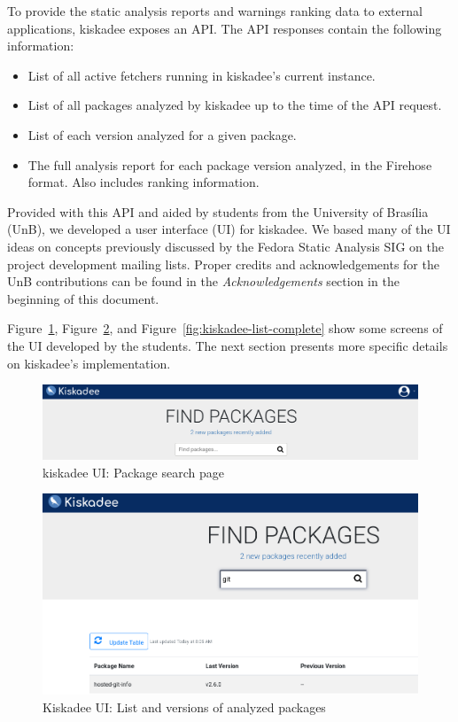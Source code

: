 To provide the static analysis reports and warnings ranking data to external
applications, kiskadee exposes an API. The API responses contain the following information:

\begin{itemize}
  \item List of all active fetchers running in kiskadee's current instance.

  \item List of all packages analyzed by kiskadee up to the time of the API request.

  \item List of each version analyzed for a given package.

  \item The full analysis report for each package version analyzed, in the Firehose format. Also includes ranking information.
\end{itemize}

Provided with this API and aided by students from the University of Brasília (UnB),
we developed a user interface (UI) for kiskadee. We based many of the UI ideas
on concepts previously discussed by the Fedora Static Analysis SIG on the
project development mailing lists. Proper credits and acknowledgements for the
UnB contributions can be found in the \emph{Acknowledgements} section in the
beginning of this document.

Figure~\ref{fig:kiskadee-main}, Figure~\ref{fig:kiskadee-list}, and
Figure~\ref{fig:kiskadee-list-complete} show some screens of the UI developed
by the students. The next section presents more specific details on kiskadee's
implementation.

\begin{figure}[!h]
  \centering
  \includegraphics[width=.95\textwidth]{figures/kiskadee-main} 
  \caption{kiskadee UI: Package search page}
  \label{fig:kiskadee-main} 
\end{figure}

\begin{figure}[!h]
  \centering
  \includegraphics[width=.95\textwidth]{figures/kiskadee-list} 
  \caption{Kiskadee UI: List and versions of analyzed packages}
  \label{fig:kiskadee-list} 
\end{figure}

